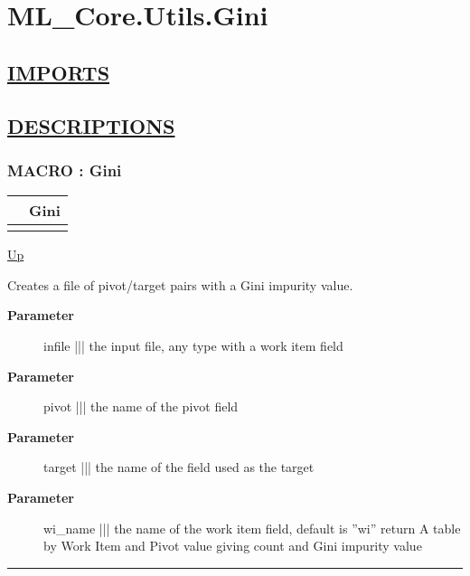 \chapter*{ML\_Core.Utils.Gini}
\hypertarget{ecldoc:toc:ML_Core.Utils.Gini}{}

\section*{\underline{IMPORTS}}

\section*{\underline{DESCRIPTIONS}}
\subsection*{MACRO : Gini}
\hypertarget{ecldoc:ml_core.utils.gini}{}

{\renewcommand{\arraystretch}{1.5}
\begin{tabularx}{\textwidth}{|>{\raggedright\arraybackslash}l|X|}
\hline
\hspace{0pt} & Gini \\
\hline
\multicolumn{2}{|>{\raggedright\arraybackslash}X|}{\hspace{0pt}(infile, pivot, target, wi\_name='wi')} \\
\hline
\end{tabularx}
}

\hyperlink{ecldoc:toc:ML_Core/Utils}{Up}

\par
Creates a file of pivot/target pairs with a Gini impurity value.

\par
\begin{description}
\item [\textbf{Parameter}] infile ||| the input file, any type with a work item field
\item [\textbf{Parameter}] pivot ||| the name of the pivot field
\item [\textbf{Parameter}] target ||| the name of the field used as the target
\item [\textbf{Parameter}] wi\_name ||| the name of the work item field, default is ''wi'' return A table by Work Item and Pivot value giving count and Gini impurity value
\end{description}

\rule{\textwidth}{0.4pt}
